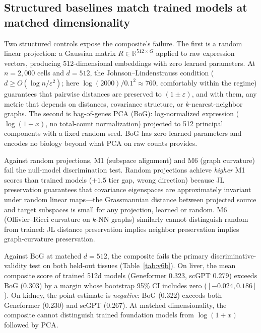 \documentclass[9pt,lineno]{elife}
\begin{document}
\subsection{Structured baselines match trained models at matched dimensionality}

Two structured controls expose the composite's failure. The first is a random linear projection: a Gaussian matrix $R \in \mathbb{R}^{512 \times G}$ applied to raw expression vectors, producing 512-dimensional embeddings with zero learned parameters. At $n = 2{,}000$ cells and $d = 512$, the Johnson--Lindenstrauss condition ($d \geq O(\log n / \varepsilon^2)$; here $\log(2000) / 0.1^2 \approx 760$, comfortably within the regime) guarantees that pairwise distances are preserved to $(1 \pm \varepsilon)$, and with them, any metric that depends on distances, covariance structure, or $k$-nearest-neighbor graphs. The second is bag-of-genes PCA (BoG): log-normalized expression ($\log(1 + x)$, no total-count normalization) projected to 512 principal components with a fixed random seed. BoG has zero learned parameters and encodes no biology beyond what PCA on raw counts provides.

Against random projections, M1 (subspace alignment) and M6 (graph curvature) fail the null-model discrimination test. Random projections achieve \emph{higher} M1 scores than trained models ($+1.5$ tier gap, wrong direction) because JL preservation guarantees that covariance eigenspaces are approximately invariant under random linear maps---the Grassmannian distance between projected source and target subspaces is small for any projection, learned or random. M6 (Ollivier--Ricci curvature on $k$-NN graphs) similarly cannot distinguish random from trained: JL distance preservation implies neighbor preservation implies graph-curvature preservation.

Against BoG at matched $d = 512$, the composite fails the primary discriminative-validity test on both held-out tissues (Table~\ref{tab:v6b}). On liver, the mean composite score of trained 512d models (Geneformer 0.323, scGPT 0.279) exceeds BoG (0.303) by a margin whose bootstrap 95\% CI includes zero ($[-0.024, 0.186]$). On kidney, the point estimate is \emph{negative}: BoG (0.322) exceeds both Geneformer (0.230) and scGPT (0.267). At matched dimensionality, the composite cannot distinguish trained foundation models from $\log(1+x)$ followed by PCA.
\end{document}
